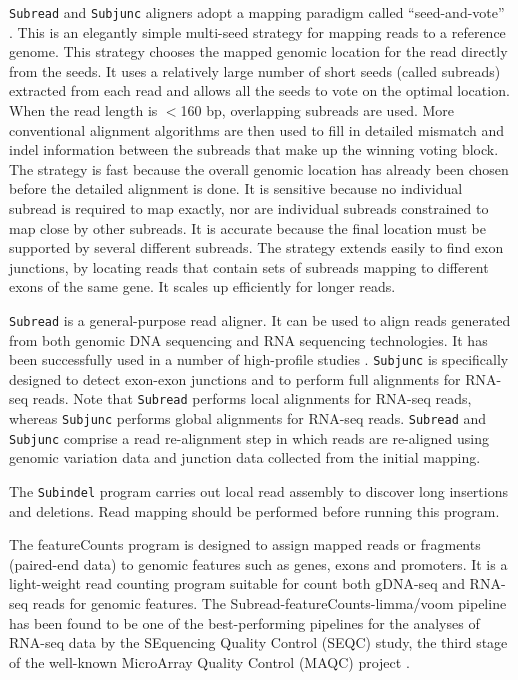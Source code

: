 \documentclass[12pt]{report}
\newcommand{\code}[1]{{\small\texttt{#1}}}
\newcommand{\featureCounts}{\textsf{featureCounts}}
\begin{document}
\code{Subread} and \code{Subjunc} aligners adopt a mapping paradigm called ``seed-and-vote'' \cite{liao}.
This is an elegantly simple multi-seed strategy for mapping reads to a reference genome. 
This strategy chooses the mapped genomic location for the read directly from the seeds.
It uses a relatively large number of short seeds (called subreads) extracted from each read and allows all the seeds to vote on the optimal location.
When the read length is $<$160 bp, overlapping subreads are used.
More conventional alignment algorithms are then used to fill in detailed mismatch and indel information between the subreads that make up the winning voting block.
The strategy is fast because the overall genomic location has already been chosen before the detailed alignment is done.
It is sensitive because no individual subread is required to map exactly, nor are individual subreads constrained to map close by other subreads.
It is accurate because the final location must be supported by several different subreads. The strategy extends easily to find exon junctions, by locating reads that contain sets of subreads mapping to different exons of the same gene.
It scales up efficiently for longer reads.

\code{Subread} is a general-purpose read aligner.
It can be used to align reads generated from both genomic DNA sequencing and RNA sequencing technologies.
It has been successfully used in a number of high-profile studies \cite{TangNC2013,ManNI2013,SpangenbergSCR2013,tang,ezh2}.
\code{Subjunc} is specifically designed to detect exon-exon junctions and to perform full alignments for RNA-seq reads.
Note that \code{Subread} performs local alignments for RNA-seq reads, whereas \code{Subjunc} performs global alignments for RNA-seq reads.
\code{Subread} and \code{Subjunc} comprise a read re-alignment step in which reads are re-aligned using genomic variation data and junction data collected from the initial mapping.

The \code{Subindel} program carries out local read assembly to discover long insertions and deletions.
Read mapping should be performed before running this program.

The {\featureCounts} program is designed to assign mapped reads or fragments (paired-end data) to genomic features such as genes, exons and promoters.
It is a light-weight read counting program suitable for count both gDNA-seq and RNA-seq reads for genomic features\cite{fcounts}.
The \textsf{Subread-featureCounts-limma/voom} pipeline has been found to be one of the best-performing pipelines for the analyses of RNA-seq data by the SEquencing Quality Control (SEQC) study, the third stage of the well-known MicroArray Quality Control (MAQC) project \cite{seqc}.
\end{document}
